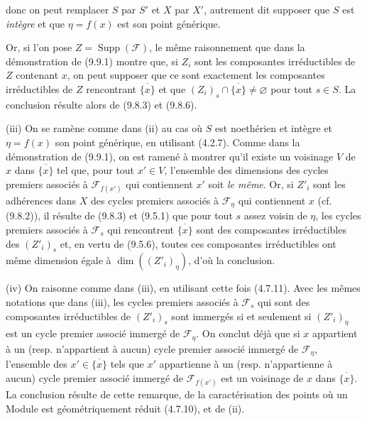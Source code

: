 
donc on peut remplacer $S$ par $S'$ et $X$ par $X'$, autrement dit supposer que
$S$ est \emph{intègre} et que $\eta=f(x)$ est son point générique.

Or, si l'on pose $Z=\operatorname{Supp}(\mathcal F)$, le même raisonnement que
dans la démonstration de (9.9.1) montre que, si $Z_i$ sont les composantes
irréductibles de $Z$ contenant $x$, on peut supposer que ce sont exactement les
composantes irréductibles de $Z$ rencontrant $\overline{\{x\}}$ et que
$(Z_i)_s\cap\overline{\{x\}}\neq\varnothing$ pour tout $s\in S$. La conclusion
résulte alors de (9.8.3) et (9.8.6).

(iii) On se ramène comme dans (ii) au cas où $S$ est noethérien et intègre et
$\eta=f(x)$ son point générique, en utilisant (4.2.7). Comme dans la
démonstration de (9.9.1), on est ramené à montrer qu'il existe un voisinage $V$
de $x$ dans $\overline{\{x\}}$ tel que, pour tout $x'\in V$, l'ensemble des
dimensions des cycles premiers associés à $\mathcal F_{f(x')}$ qui contiennent
$x'$ soit \emph{le même}. Or, si $Z'_i$ sont les adhérences dans $X$ des cycles
premiers associés à $\mathcal F_\eta$ qui contiennent $x$ (cf. (9.8.2)), il
résulte de (9.8.3) et (9.5.1) que pour tout $s$ assez voisin de $\eta$, les
cycles premiers associés à $\mathcal F_s$ qui rencontrent
$\overline{\{x\}}$ sont des composantes irréductibles des $(Z'_i)_s$ et, en
vertu de (9.5.6), toutes ces composantes irréductibles ont même dimension égale
à $\dim((Z'_i)_\eta)$, d'où la conclusion.

(iv) On raisonne comme dans (iii), en utilisant cette fois (4.7.11). Avec les
mêmes notations que dans (iii), les cycles premiers associés à $\mathcal F_s$
qui sont des composantes irréductibles de $(Z'_i)_s$ sont immergés si et
seulement si $(Z'_i)_\eta$ est un cycle premier associé immergé de
$\mathcal F_\eta$. On conclut déjà que si $x$ appartient à un (resp.
n'appartient à aucun) cycle premier associé immergé de $\mathcal F_\eta$,
l'ensemble des $x'\in\overline{\{x\}}$ tels que $x'$ appartienne à un (resp.
n'appartienne à aucun) cycle premier associé immergé de $\mathcal F_{f(x')}$
est un voisinage de $x$ dans $\overline{\{x\}}$. La conclusion résulte de cette
remarque, de la caractérisation des points où un Module est géométriquement
réduit (4.7.10), et de (ii).

